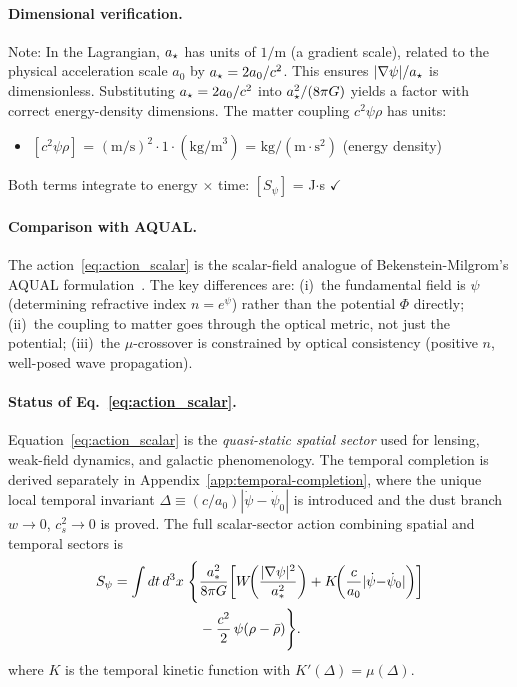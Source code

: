 \paragraph{Dimensional verification.}
Note: In the Lagrangian, $a_\star$ has units of $1/\text{m}$ (a gradient scale), 
related to the physical acceleration scale $a_0$ by $a_\star = 2a_0/c^2$. This ensures 
$|\nabla\psi|/a_\star$ is dimensionless. Substituting $a_\star = 2a_0/c^2$ into 
$a_\star^2/(8\pi G)$ yields a factor with correct energy-density dimensions.
The matter coupling $c^2\psi\rho$ has units:
\begin{itemize}
\item $[c^2\psi\rho]$ = $(\text{m/s})^2 \cdot 1 \cdot (\text{kg/m}^3)$ 
= $\text{kg}/(\text{m}\cdot\text{s}^2)$ (energy density)
\end{itemize}
Both terms integrate to energy $\times$ time: $[S_\psi]$ = J$\cdot$s $\checkmark$

\paragraph{Comparison with AQUAL.}
The action~\eqref{eq:action_scalar} is the scalar-field analogue of 
Bekenstein-Milgrom's AQUAL formulation~\cite{BekensteinMilgrom1984}. 
The key differences are: (i)~the fundamental field is $\psi$ (determining 
refractive index $n = e^\psi$) rather than the potential $\Phi$ directly; 
(ii)~the coupling to matter goes through the optical metric, not just the 
potential; (iii)~the $\mu$-crossover is constrained by optical consistency 
(positive $n$, well-posed wave propagation).

\paragraph{Status of Eq.~\eqref{eq:action_scalar}.}
Equation~\eqref{eq:action_scalar} is the \emph{quasi-static spatial sector} used for lensing, weak-field dynamics, and galactic phenomenology.  The temporal completion is derived separately in Appendix~\ref{app:temporal-completion}, where the unique local temporal invariant $\Delta \equiv (c/a_0)|\dot\psi - \dot\psi_0|$ is introduced and the dust branch $w\to 0$, $c_s^2\to 0$ is proved.  The full scalar-sector action combining spatial and temporal sectors is
\begin{align}\label{eq:action-full-dynamic}
S_\psi = \int dt\,d^3x\;\Biggl\{
  &\frac{a_*^2}{8\pi G}\biggl[
    W\!\biggl(\frac{|\nabla\psi|^2}{a_*^2}\biggr)
    + K\!\biggl(\frac{c}{a_0}|\dot\psi{-}\dot\psi_0|\biggr)
  \biggr] \notag\\
  &- \frac{c^2}{2}\,\psi(\rho - \bar\rho)
\Biggr\}.
\end{align}
where $K$ is the temporal kinetic function with $K'(\Delta) = \mu(\Delta)$.

